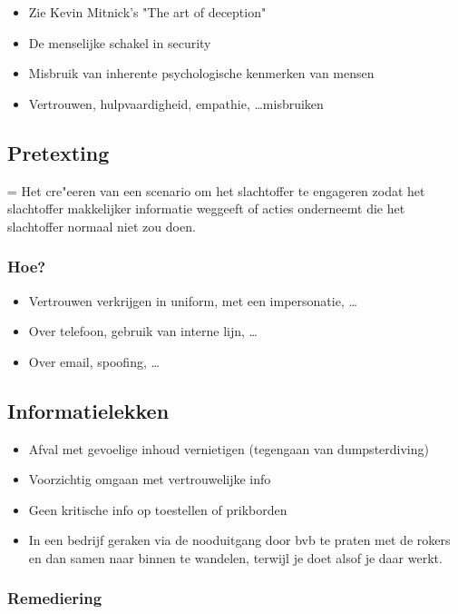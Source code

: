 \documentclass{article}
\begin{document}
\begin{itemize}
    \item Zie Kevin Mitnick's "The art of deception"
    \item De menselijke schakel in security
    \item Misbruik van inherente psychologische kenmerken van mensen
    \item Vertrouwen, hulpvaardigheid, empathie, \dots misbruiken
\end{itemize}

\subsection{Pretexting}

= Het cre"eeren van een scenario om het 
slachtoffer te engageren zodat het slachtoffer 
makkelijker informatie weggeeft of acties onderneemt 
die het slachtoffer normaal niet zou doen.


\subsubsection{Hoe?}

\begin{itemize}
    \item Vertrouwen verkrijgen in uniform, met een impersonatie, \dots
    \item Over telefoon, gebruik van interne lijn, \dots
    \item Over email, spoofing, \dots
\end{itemize}

\subsection{Informatielekken}

\begin{itemize}
    \item Afval met gevoelige inhoud vernietigen (tegengaan van dumpsterdiving)
    \item Voorzichtig omgaan met vertrouwelijke info
    \item Geen kritische info op toestellen of prikborden
    \item In een bedrijf geraken via de nooduitgang door bvb te praten met de rokers en dan samen naar binnen te wandelen, terwijl je doet alsof je daar werkt.
\end{itemize}

\subsubsection{Remediering}
\end{document}
